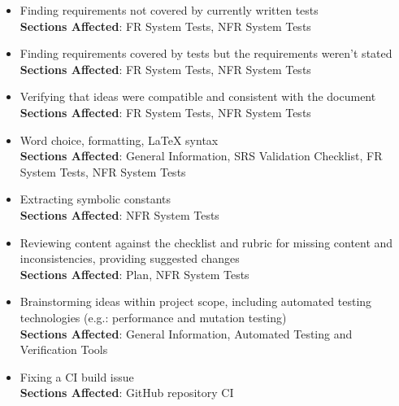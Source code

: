 \documentclass[12pt, titlepage]{article}
\begin{document}



\begin{itemize}
  \item Finding requirements not covered by currently written tests\\
  \textbf{Sections Affected}: FR System Tests, NFR System Tests

  \item Finding requirements covered by tests but the requirements weren't stated\\
  \textbf{Sections Affected}: FR System Tests, NFR System Tests

  \item Verifying that ideas were compatible and consistent with the document\\
  \textbf{Sections Affected}: FR System Tests, NFR System Tests

  \item Word choice, formatting, \LaTeX{} syntax\\
  \textbf{Sections Affected}: General Information, SRS Validation Checklist,
  FR System Tests, NFR System Tests

  \item Extracting symbolic constants\\
  \textbf{Sections Affected}: NFR System Tests

  \item Reviewing content against the checklist and rubric for missing content and
  inconsistencies, providing suggested changes\\
  \textbf{Sections Affected}: Plan, NFR System Tests

  \item Brainstorming ideas within project scope, including automated testing
  technologies (e.g.: performance and mutation testing)\\
  \textbf{Sections Affected}: General Information, Automated Testing and
  Verification Tools

  \item Fixing a CI build issue\\
  \textbf{Sections Affected}: GitHub repository CI
\end{itemize}
\end{document}
